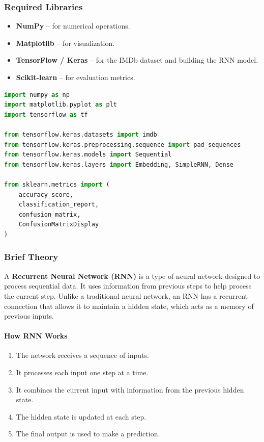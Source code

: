 \documentclass[a4paper,11pt]{article}
\begin{document}
\begin{itemize}
\subsubsection{Required Libraries}
\begin{itemize}
    \item \textbf{NumPy} -- for numerical operations.
    \item \textbf{Matplotlib} -- for visualization.
    \item \textbf{TensorFlow / Keras} -- for the IMDb dataset and building the RNN model.
    \item \textbf{Scikit-learn} -- for evaluation metrics.
\end{itemize}

\begin{lstlisting}[language=Python, caption={Required Imports}]
import numpy as np
import matplotlib.pyplot as plt
import tensorflow as tf

from tensorflow.keras.datasets import imdb
from tensorflow.keras.preprocessing.sequence import pad_sequences
from tensorflow.keras.models import Sequential
from tensorflow.keras.layers import Embedding, SimpleRNN, Dense

from sklearn.metrics import (
    accuracy_score,
    classification_report,
    confusion_matrix,
    ConfusionMatrixDisplay
)
\end{lstlisting}

\subsubsection{Brief Theory}
A \textbf{Recurrent Neural Network (RNN)} is a type of neural network designed to process sequential data. It uses information from previous steps to help process the current step. Unlike a traditional neural network, an RNN has a recurrent connection that allows it to maintain a hidden state, which acts as a memory of previous inputs.

\paragraph{How RNN Works}
\begin{enumerate}
    \item The network receives a sequence of inputs.
    \item It processes each input one step at a time.
    \item It combines the current input with information from the previous hidden state.
    \item The hidden state is updated at each step.
    \item The final output is used to make a prediction.
\end{enumerate}


\end{itemize}
\end{document}
